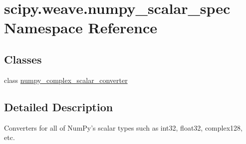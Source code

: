 \hypertarget{namespacescipy_1_1weave_1_1numpy__scalar__spec}{}\section{scipy.\+weave.\+numpy\+\_\+scalar\+\_\+spec Namespace Reference}
\label{namespacescipy_1_1weave_1_1numpy__scalar__spec}
\subsection*{Classes}
\begin{DoxyCompactItemize}
\item 
class \hyperlink{classscipy_1_1weave_1_1numpy__scalar__spec_1_1numpy__complex__scalar__converter}{numpy\+\_\+complex\+\_\+scalar\+\_\+converter}
\end{DoxyCompactItemize}


\subsection{Detailed Description}
\begin{DoxyVerb}Converters for all of NumPy's scalar types such as
    int32, float32, complex128, etc.
\end{DoxyVerb}
 